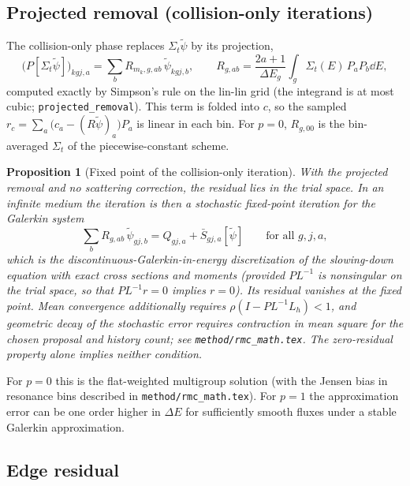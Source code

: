 \documentclass[11pt]{article}
\newtheorem{proposition}{Proposition}
\newcommand{\tpsi}{\tilde\psi}
\newcommand{\Sbar}{\bar S}
\newcommand{\Sigt}{\Sigma_t}
\begin{document}
\subsection{Projected removal (collision-only iterations)}

The collision-only phase replaces $\Sigt\tpsi$ by its projection,
\begin{equation}
  \big(P[\Sigt\tpsi]\big)_{kgj,a} = \sum_b R_{m_k,g,ab}\,\tpsi_{kgj,b},\qquad
  R_{g,ab} = \frac{2a+1}{\Delta E_g}\int_g\Sigt(E)\,P_aP_b\dd E ,
\end{equation}
computed exactly by Simpson's rule on the lin-lin grid (the integrand is at most
cubic; \texttt{projected\_removal}). This term is folded into $c$, so the sampled
$r_c = \sum_a\big(c_a - (R\tpsi)_a\big)P_a$ is linear in each bin. For $p=0$,
$R_{g,00}$ is the bin-averaged $\Sigt$ of the piecewise-constant scheme.

\begin{proposition}[Fixed point of the collision-only iteration]
With the projected removal and no scattering correction, the residual lies in the
trial space. In an infinite medium the iteration is then a stochastic fixed-point
iteration for the Galerkin system
\[
  \sum_b R_{g,ab}\,\tpsi_{gj,b} = Q_{gj,a} + \Sbar_{gj,a}[\tpsi]
  \qquad\text{for all } g, j, a ,
\]
which is the discontinuous-Galerkin-in-energy discretization of the slowing-down
equation with exact cross sections and moments (provided $PL^{-1}$ is nonsingular on
the trial space, so that $PL^{-1}r=0$ implies $r=0$). Its residual vanishes at the
fixed point. Mean convergence additionally requires
$\rho(I-PL^{-1}L_h)<1$, and geometric decay of the stochastic error requires
contraction in mean square for the chosen proposal and history count; see
\texttt{method/rmc\_math.tex}. The zero-residual property alone implies neither condition.
\end{proposition}

For $p=0$ this is the flat-weighted multigroup solution (with the Jensen bias in
resonance bins described in \texttt{method/rmc\_math.tex}). For $p=1$ the approximation
error can be one order higher in $\Delta E$ for sufficiently smooth fluxes
under a stable Galerkin approximation.

\subsection{Edge residual}
\end{document}
